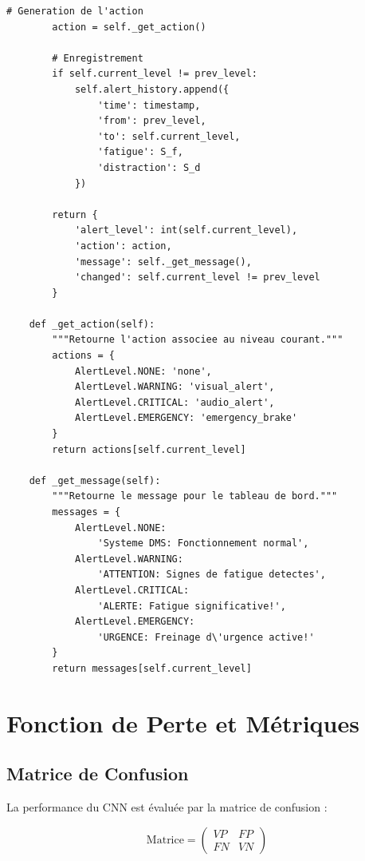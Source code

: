 \documentclass[12pt,a4paper,twoside]{report}
\begin{document}
\begin{lstlisting}[style=pythonstyle, caption={Module de logique décisionnelle ECU.}, label={lst:ecu}]
        # Generation de l'action
        action = self._get_action()
        
        # Enregistrement
        if self.current_level != prev_level:
            self.alert_history.append({
                'time': timestamp,
                'from': prev_level,
                'to': self.current_level,
                'fatigue': S_f,
                'distraction': S_d
            })
        
        return {
            'alert_level': int(self.current_level),
            'action': action,
            'message': self._get_message(),
            'changed': self.current_level != prev_level
        }
    
    def _get_action(self):
        """Retourne l'action associee au niveau courant."""
        actions = {
            AlertLevel.NONE: 'none',
            AlertLevel.WARNING: 'visual_alert',
            AlertLevel.CRITICAL: 'audio_alert',
            AlertLevel.EMERGENCY: 'emergency_brake'
        }
        return actions[self.current_level]
    
    def _get_message(self):
        """Retourne le message pour le tableau de bord."""
        messages = {
            AlertLevel.NONE: 
                'Systeme DMS: Fonctionnement normal',
            AlertLevel.WARNING: 
                'ATTENTION: Signes de fatigue detectes',
            AlertLevel.CRITICAL: 
                'ALERTE: Fatigue significative!',
            AlertLevel.EMERGENCY: 
                'URGENCE: Freinage d\'urgence active!'
        }
        return messages[self.current_level]
\end{lstlisting}

\section{Fonction de Perte et Métriques}

\subsection{Matrice de Confusion}

La performance du CNN est évaluée par la matrice de confusion :

\begin{equation}
\text{Matrice} = \begin{pmatrix} VP & FP \\ FN & VN \end{pmatrix}
\label{eq:confusion_matrix}
\end{equation}
\end{document}
